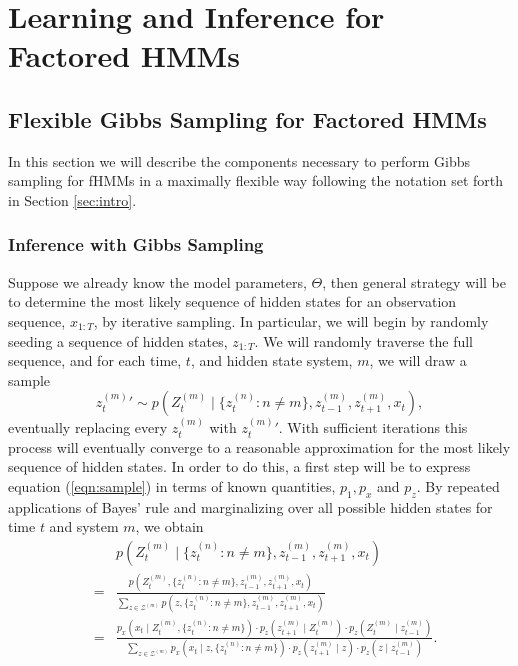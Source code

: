 \documentclass{amsart}
\begin{document}
\section{Learning and Inference for Factored HMMs}

\subsection{Flexible Gibbs Sampling for Factored HMMs}

In this section we will describe the components necessary to perform Gibbs 
sampling for fHMMs in a maximally flexible way following the notation set forth 
in Section \ref{sec:intro}.  

\subsubsection{Inference with Gibbs Sampling}
Suppose we already know the model parameters, 
$\Theta$, then general strategy will be to determine the most 
likely sequence of hidden states for an observation sequence, $x_{1:T}$, by iterative 
sampling.  In particular, we will begin by randomly seeding a sequence of hidden 
states, $z_{1:T}$.  We will randomly traverse the full sequence, and for each time, 
$t$, and hidden state system, $m$, we will draw a sample  
\begin{equation}\label{eqn:sample}
{z_t^{(m)}}'\sim p(Z_t^{(m)}\mid \{z_t^{(n)}:n\neq m\},z_{t-1}^{(m)}, z_{t+1}^{(m)}, x_t),
\end{equation}
eventually replacing every $z_t^{(m)}$ with ${z_t^{(m)}}'$.  With sufficient 
iterations this process will eventually converge to a reasonable approximation 
for the most likely sequence of hidden states.  In order to do this, a first 
step will be to express equation (\ref{eqn:sample}) in terms of known 
quantities, $p_1,p_x$ and $p_z$.  By repeated applications of Bayes' rule and marginalizing over all possible hidden 
states for time $t$ and system $m$, we obtain 
\begin{eqnarray*}
&&p(Z_t^{(m)}\mid \{z_t^{(n)}:n\neq m\},z_{t-1}^{(m)}, z_{t+1}^{(m)}, x_t)\\
& = & \frac{
p(Z_t^{(m)},\{z_t^{(n)}:n\neq m\},z_{t-1}^{(m)}, z_{t+1}^{(m)}, x_t)
}{
\sum_{z\in \mathcal Z^{(m)}}p(z,\{z_t^{(n)}:n\neq m\},z_{t-1}^{(m)}, 
z_{t+1}^{(m)}, x_t)
}\\
& = & \frac{
p_x(x_t\mid Z_t^{(m)},\{z_t^{(n)}:n\neq m\})\cdot
p_z(z_{t+1}^{(m)}\mid Z_t^{(m)})\cdot
p_z(Z_t^{(m)}\mid z_{t-1}^{(m)})
}{
\sum_{z\in \mathcal Z^{(m)}}
p_x(x_t\mid z,\{z_t^{(n)}:n\neq m\})\cdot
p_z(z_{t+1}^{(m)}\mid z)\cdot
p_z(z\mid z_{t-1}^{(m)})
}.
\end{eqnarray*}
\end{document}
